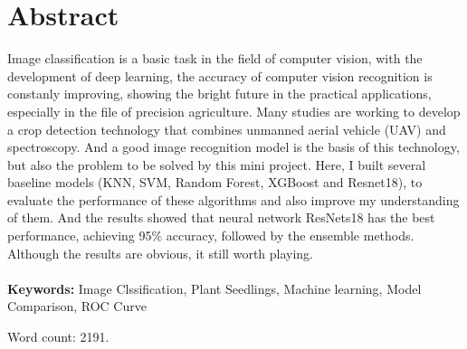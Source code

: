 \documentclass[11pt]{article}
\begin{document}





\doublespacing
\linenumbers 
\section{Abstract}
Image classification is a basic task in the field of computer vision, with the development of deep learning, the accuracy of computer vision recognition is constanly improving, showing the bright future in the practical applications, especially in the file of precision agriculture. Many studies are working to develop a crop detection technology that combines unmanned aerial vehicle (UAV) and spectroscopy. And a good image recognition model is the basis of this technology, but also the problem to be solved by this mini project. Here, I built several baseline models (KNN, SVM, Random Forest, XGBoost and Resnet18), to evaluate the performance of these algorithms and also improve my understanding of them. And the results showed that neural network ResNets18 has the best performance, achieving 95\% accuracy, followed by the ensemble methods. Although the results are obvious, it still worth playing.
\\
\\
\textbf{Keywords:} Image Clssification, Plant Seedlings, Machine learning, Model Comparison, ROC Curve

\begin{flushleft} 
\vspace{3cm}
Word count: 2191.
\newpage
\end{flushleft}
\end{document}
